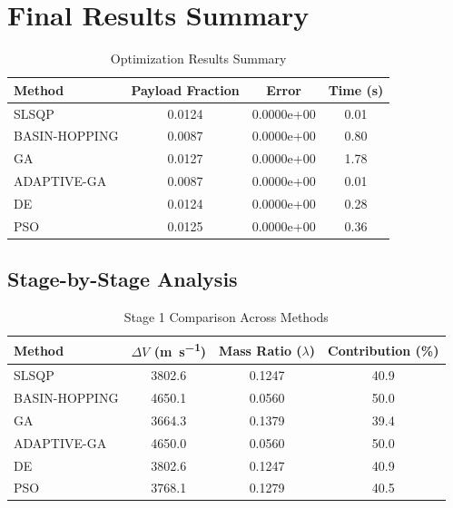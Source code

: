 \documentclass{article}
\begin{document}
\section{Final Results Summary}
\begin{table}[H]
\centering
\caption{Optimization Results Summary}
\begin{tabular}{lS[table-format=1.4]S[table-format=1.4e-1]S[table-format=1.2]}
\toprule
Method & {Payload Fraction} & {Error} & {Time (\si{\second})} \\
\midrule
SLSQP        & 0.0124 & 0.0000e+00 & 0.01 \\
BASIN-HOPPING & 0.0087 & 0.0000e+00 & 0.80 \\
GA           & 0.0127 & 0.0000e+00 & 1.78 \\
ADAPTIVE-GA  & 0.0087 & 0.0000e+00 & 0.01 \\
DE           & 0.0124 & 0.0000e+00 & 0.28 \\
PSO          & 0.0125 & 0.0000e+00 & 0.36 \\
\bottomrule
\end{tabular}
\end{table}

\subsection{Stage-by-Stage Analysis}


\begin{table}[H]
\centering
\caption{Stage 1 Comparison Across Methods}
\begin{tabular}{lS[table-format=4.1]S[table-format=1.4]S[table-format=3.1]}
\toprule
Method & {$\Delta V$ (\si{\meter\per\second})} & {Mass Ratio ($\lambda$)} & {Contribution (\%)} \\
\midrule
SLSQP        & 3802.6 & 0.1247 & 40.9 \\
BASIN-HOPPING & 4650.1 & 0.0560 & 50.0 \\
GA           & 3664.3 & 0.1379 & 39.4 \\
ADAPTIVE-GA  & 4650.0 & 0.0560 & 50.0 \\
DE           & 3802.6 & 0.1247 & 40.9 \\
PSO          & 3768.1 & 0.1279 & 40.5 \\
\bottomrule
\end{tabular}
\end{table}
\end{document}
